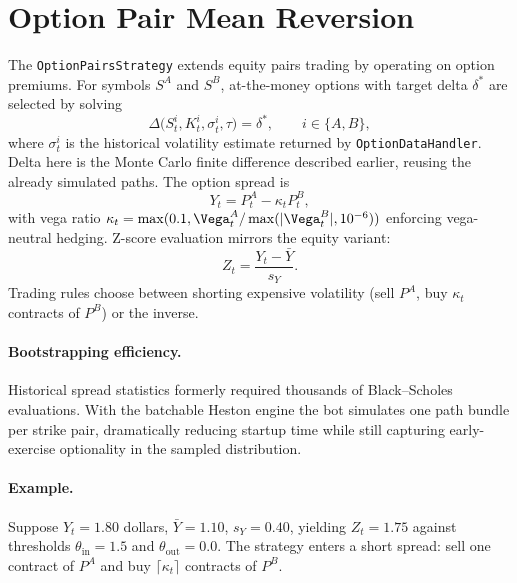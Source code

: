 \section{Option Pair Mean Reversion}
The \texttt{OptionPairsStrategy} extends equity pairs trading by operating on option premiums. For symbols $S^A$ and $S^B$, at-the-money options with target delta $\delta^*$ are selected by solving
\begin{equation}
\Delta\bigl(S^i_t,K^i_t,\sigma^i_t,\tau\bigr) = \delta^*, \qquad i \in \{A,B\},
\end{equation}
where $\sigma^i_t$ is the historical volatility estimate returned by \texttt{OptionDataHandler}. Delta here is the Monte Carlo finite difference described earlier, reusing the already simulated paths. The option spread is
\begin{equation}
Y_t = P^A_t - \kappa_t P^B_t,
\end{equation}
with vega ratio $\kappa_t = \max(0.1, \Vega^A_t / \max(|\Vega^B_t|,10^{-6}))$ enforcing vega-neutral hedging. Z-score evaluation mirrors the equity variant:
\begin{equation}
Z_t = \frac{Y_t - \bar{Y}}{s_Y}.
\end{equation}
Trading rules choose between shorting expensive volatility (sell $P^A$, buy $\kappa_t$ contracts of $P^B$) or the inverse.

\paragraph{Bootstrapping efficiency.} Historical spread statistics formerly required thousands of Black--Scholes evaluations. With the batchable Heston engine the bot simulates one path bundle per strike pair, dramatically reducing startup time while still capturing early-exercise optionality in the sampled distribution.

\paragraph{Example.} Suppose $Y_t = 1.80$ dollars, $\bar{Y}=1.10$, $s_Y=0.40$, yielding $Z_t=1.75$ against thresholds $\theta_{\text{in}}=1.5$ and $\theta_{\text{out}}=0.0$. The strategy enters a short spread: sell one contract of $P^A$ and buy $\lceil \kappa_t \rceil$ contracts of $P^B$.

